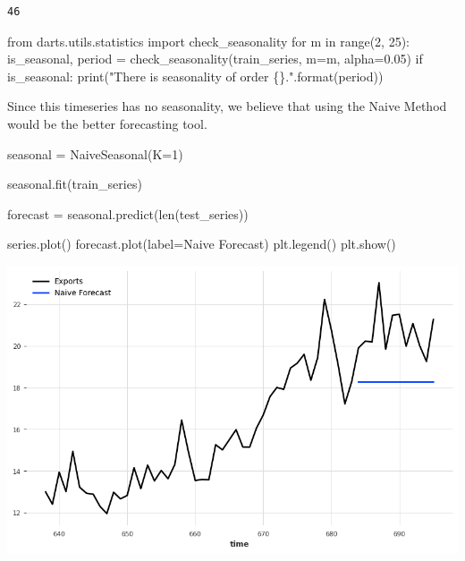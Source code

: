\documentclass[
  11pt,
]{article}
\newenvironment{Shaded}{\begin{snugshade}}{\end{snugshade}}
\newcommand{\BuiltInTok}[1]{\textcolor[rgb]{0.00,0.23,0.31}{#1}}
\newcommand{\ControlFlowTok}[1]{\textcolor[rgb]{0.00,0.23,0.31}{#1}}
\newcommand{\DecValTok}[1]{\textcolor[rgb]{0.68,0.00,0.00}{#1}}
\newcommand{\FloatTok}[1]{\textcolor[rgb]{0.68,0.00,0.00}{#1}}
\newcommand{\ImportTok}[1]{\textcolor[rgb]{0.00,0.46,0.62}{#1}}
\newcommand{\KeywordTok}[1]{\textcolor[rgb]{0.00,0.23,0.31}{#1}}
\newcommand{\NormalTok}[1]{\textcolor[rgb]{0.00,0.23,0.31}{#1}}
\newcommand{\OperatorTok}[1]{\textcolor[rgb]{0.37,0.37,0.37}{#1}}
\newcommand{\SpecialCharTok}[1]{\textcolor[rgb]{0.37,0.37,0.37}{#1}}
\newcommand{\StringTok}[1]{\textcolor[rgb]{0.13,0.47,0.30}{#1}}
\begin{document}
\begin{verbatim}
46
\end{verbatim}

\begin{Shaded}
\begin{Highlighting}[]
\ImportTok{from}\NormalTok{ darts.utils.statistics }\ImportTok{import}\NormalTok{ check\_seasonality}
\ControlFlowTok{for}\NormalTok{ m }\KeywordTok{in} \BuiltInTok{range}\NormalTok{(}\DecValTok{2}\NormalTok{, }\DecValTok{25}\NormalTok{):}
\NormalTok{    is\_seasonal, period }\OperatorTok{=}\NormalTok{ check\_seasonality(train\_series, m}\OperatorTok{=}\NormalTok{m, alpha}\OperatorTok{=}\FloatTok{0.05}\NormalTok{)}
    \ControlFlowTok{if}\NormalTok{ is\_seasonal:}
        \BuiltInTok{print}\NormalTok{(}\StringTok{"There is seasonality of order }\SpecialCharTok{\{\}}\StringTok{."}\NormalTok{.}\BuiltInTok{format}\NormalTok{(period))}
\end{Highlighting}
\end{Shaded}

Since this timeseries has no seasonality, we believe that using the
Naive Method would be the better forecasting tool.

\begin{Shaded}
\begin{Highlighting}[]

\NormalTok{seasonal }\OperatorTok{=}\NormalTok{ NaiveSeasonal(K}\OperatorTok{=}\DecValTok{1}\NormalTok{) }

\NormalTok{seasonal.fit(train\_series)}

\NormalTok{forecast }\OperatorTok{=}\NormalTok{ seasonal.predict(}\BuiltInTok{len}\NormalTok{(test\_series))}

\NormalTok{series.plot()}
\NormalTok{forecast.plot(label}\OperatorTok{=}\StringTok{\textquotesingle{}Naive Forecast\textquotesingle{}}\NormalTok{)}
\NormalTok{plt.legend()}
\NormalTok{plt.show()}
\end{Highlighting}
\end{Shaded}

\includegraphics{hw3_files/figure-pdf/cell-43-output-1.png}
\end{document}
